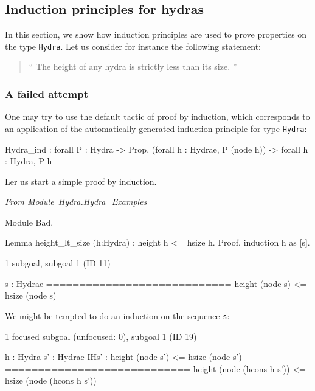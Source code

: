 \subsection{Induction principles for hydras}
\label{sec:orgheadline42}


In this section, we show how induction principles are used to prove properties on the type 
\texttt{Hydra}. Let us consider for instance the following statement:
\begin{quote}
  `` The height of any hydra is strictly less than its size. ''
\end{quote}



\subsubsection{A failed attempt}

One may try to use the default tactic of proof by induction, which corresponds to an application of the automatically  generated  induction principle for  type \texttt{Hydra}:

\begin{Coqanswer}
Hydra_ind :
forall P : Hydra -> Prop,
(forall h : Hydrae, P (node h)) -> forall h : Hydra, P h
\end{Coqanswer}

Ler us start a simple proof by induction.

\vspace{4pt}
\noindent
\emph{From Module~\href{../theories/html/hydras.Hydra.Hydra_Examples.html}{Hydra.Hydra\_Examples}}

\begin{Coqbad}
Module Bad.

Lemma height_lt_size (h:Hydra) :
  height h <= hsize h.
Proof.
  induction h as [s].
\end{Coqbad}

\begin{Coqanswer}
1 subgoal, subgoal 1 (ID 11)
  
  s : Hydrae
  ============================
   height (node s) <= hsize (node s)
\end{Coqanswer}

We might be tempted to do an induction on the sequence \texttt{s}:



\begin{Coqanswer}
 1 focused subgoal
(unfocused: 0), subgoal 1 (ID 19)
  
  h : Hydra
  s' : Hydrae
  IHs' : height (node s') <= hsize (node s')
  ============================
   height (node (hcons h s')) <= hsize (node (hcons h s'))

\end{Coqanswer}

